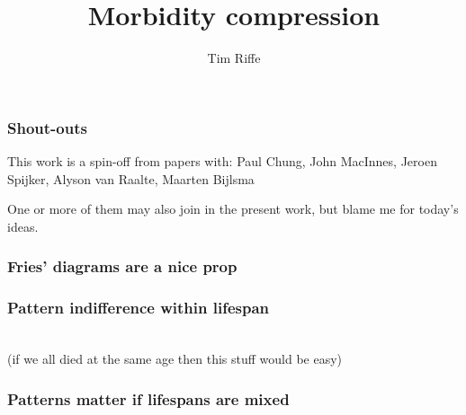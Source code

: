 \documentclass[20pt]{beamer}
\title{Morbidity compression}
\subtitle{Tim Riffe}		%
\begin{document}

\begin{frame}
	\titlepage
\end{frame}

\begin{frame}
	\frametitle{Shout-outs}
	\begin{block}{This work is a spin-off from papers with:}
	Paul Chung, John MacInnes, Jeroen Spijker, Alyson van Raalte, Maarten Bijlsma
	\end{block}
	One or more of them may also join in the present work, but blame me for today's
	ideas.
\end{frame}

\begin{frame}
\frametitle{Fries' diagrams are a nice prop}
\begin{center}
\end{center}
\end{frame}


\begin{frame}
\frametitle{Pattern indifference within lifespan}
\begin{center}
  \\ \vspace{5cm}
  (if we all died at the same age then this stuff would be easy)
\end{center}

\end{frame}
\begin{frame}
\frametitle{Patterns matter if lifespans are mixed}
\begin{center}
\end{center}
\end{frame}
\end{document}
